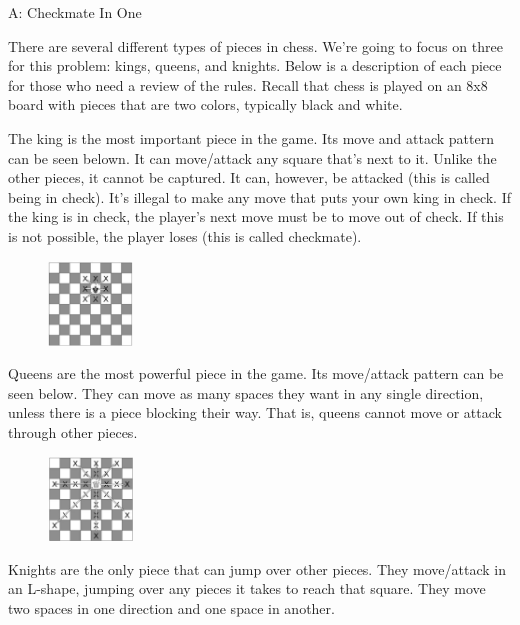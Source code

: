 \begin{problem}{A: Checkmate In One}

There are several different types of pieces in chess. We're going to focus on three for this problem: kings, queens, and knights. Below is a description of each piece for those who need a review of the rules. Recall that chess is played on an 8x8 board with pieces that are two colors, typically black and white.

The king is the most important piece in the game. Its move and attack pattern can be seen belown. It can move/attack any square that's next to it. Unlike the other pieces, it cannot be captured. It can, however, be attacked (this is called being in check). It's illegal to make any move that puts your own king in check. If the king is in check, the player's next move must be to move out of check. If this is not possible, the player loses (this is called checkmate).

\begin{figure}[h]
    \centering
    \includegraphics[width=0.2\textwidth]{king-moves.eps}
\end{figure}

Queens are the most powerful piece in the game. Its move/attack pattern can be seen below. They can move as many spaces they want in any single direction, unless there is a piece blocking their way. That is, queens cannot move or attack through other pieces.

\begin{figure}[h]
    \centering
    \includegraphics[width=0.2\textwidth]{queen-moves.eps}
\end{figure}

Knights are the only piece that can jump over other pieces. They move/attack in an L-shape, jumping over any pieces it takes to reach that square. They move two spaces in one direction and one space in another.


\end{problem}
